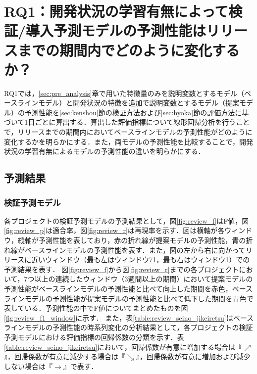 \documentclass[11pt]{jreport}
\newcommand{\rqone}{開発状況の学習有無によって検証/導入予測モデルの予測性能はリリースまでの期間内でどのように変化するか？}
\begin{document}
\chapter{RQ1：\rqone}\label{sec:rq1}
RQ1では，\ref{sec:pre_analysis}章で用いた特徴量のみを説明変数とするモデル（ベースラインモデル）と開発状況の特徴を追加で説明変数とするモデル（提案モデル）の予測性能を\ref{sec:kenshou}節の検証方法および\ref{sec:hyoka}節の評価方法に基づいて1日ごとに算出する．算出した評価指標について線形回帰分析を行うことで，リリースまでの期間内においてベースラインモデルの予測性能がどのように変化するかを明らかにする．また，両モデルの予測性能を比較することで，開発状況の学習有無によるモデルの予測性能の違いを明らかにする．

\section{予測結果}
\subsection{検証予測モデル}\label{sec:rq1_kenshou}
各プロジェクトの検証予測モデルの予測結果として，図\ref{fig:review_f}はF値，図\ref{fig:review_p}は適合率，図\ref{fig:review_r}は再現率を示す．図は横軸が各ウィンドウ，縦軸が予測性能を表しており，赤の折れ線が提案モデルの予測性能，青の折れ線がベースラインモデルの予測性能を表す．また，図の左から右に向かってリリースに近いウィンドウ（最も左はウィンドウ71，最も右はウィンドウ1）での予測結果を表す．
図\ref{fig:review_f}から図\ref{fig:review_r}までの各プロジェクトにおいて，7つ以上の連続したウィンドウ（3週間以上の期間）において提案モデルの予測性能がベースラインモデルの予測性能と比べて向上した期間を赤色，ベースラインモデルの予測性能が提案モデルの予測性能と比べて低下した期間を青色で表している．予測性能の中でF値についてまとめたものを図\ref{fig:review_f1_window}に示す．
また，表\ref{table:review_seino_jikeiretsu}はベースラインモデルの予測性能の時系列変化の分析結果として，各プロジェクトの検証予測モデルにおける評価指標の回帰係数の分類を示す．表\ref{table:review_seino_jikeiretsu}において，回帰係数が有意に増加する場合は『$\nearrow$』，回帰係数が有意に減少する場合は『$\searrow$』，回帰係数が有意に増加および減少しない場合は『$\rightarrow$』で表す．
\end{document}
